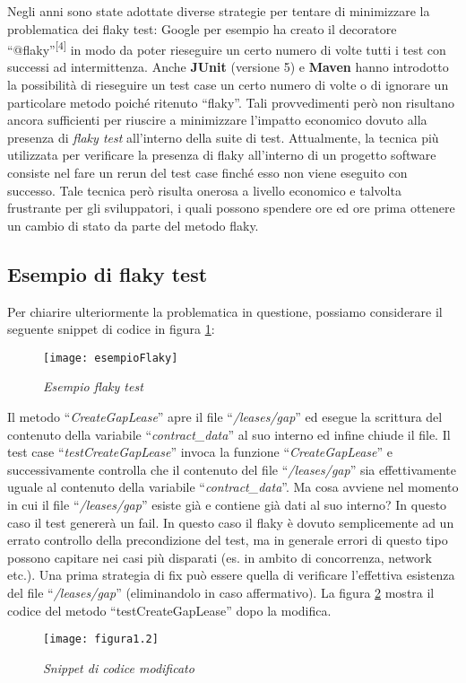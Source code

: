 Negli anni sono state adottate diverse strategie per tentare di minimizzare la problematica dei flaky test: Google per esempio ha creato il decoratore “@flaky”\textsuperscript{[4]}
in modo da poter rieseguire un certo numero di volte tutti i test con successi ad intermittenza. Anche \textbf{JUnit} (versione 5) e \textbf{Maven} hanno introdotto la possibilità di rieseguire un test case un certo numero di volte\cite{petersen2015guidelines}\cite{luo2014empirical} o di ignorare un particolare
metodo poiché ritenuto “flaky”. Tali provvedimenti però non risultano ancora sufficienti per riuscire a minimizzare l’impatto economico dovuto alla presenza di \emph{flaky test} all’interno della suite di test. Attualmente, la tecnica più utilizzata per verificare la presenza di flaky all’interno di un progetto software consiste nel fare un rerun del test case finché esso non viene eseguito con successo. Tale tecnica però
risulta onerosa a livello economico e talvolta frustrante per gli sviluppatori, i quali possono spendere ore ed ore prima ottenere un cambio di stato da parte del metodo flaky.
\subsection{Esempio di flaky test}

Per chiarire ulteriormente la problematica in questione, possiamo considerare il seguente snippet di codice in figura \ref{fig:fig1.1}:
\begin{figure}[h]
	\centering
	\texttt{[image: esempioFlaky]}
	\caption{\emph{Esempio flaky test}}
	\label{fig:fig1.1}
\end{figure}

Il metodo “\emph{CreateGapLease}” apre il file “\emph{/leases/gap}” ed esegue la scrittura del contenuto della variabile “\emph{contract\_data}” al suo interno ed infine chiude il file.
Il test case “\emph{testCreateGapLease}” invoca la funzione “\emph{CreateGapLease}” e successivamente controlla che il contenuto del file “\emph{/leases/gap}” sia effettivamente
uguale al contenuto della variabile “\emph{contract\_data}”.
Ma cosa avviene nel momento in cui il file “\emph{/leases/gap}” esiste già e contiene già dati al suo interno? In questo caso il test genererà un fail. In questo caso il flaky
è dovuto semplicemente ad un errato controllo della precondizione del test, ma in generale errori di questo tipo possono capitare nei casi più disparati (es. in ambito di concorrenza, network etc.).
Una prima strategia di fix può essere quella di verificare l’effettiva esistenza del file “\emph{/leases/gap}” (eliminandolo in caso affermativo).
La figura \ref{fig:fig1.2} mostra il codice del metodo “testCreateGapLease” dopo la modifica.
\begin{figure}[h]
	\centering
	\texttt{[image: figura1.2]}
	\caption{\emph{Snippet di codice modificato}}
	\label{fig:fig1.2}
\end{figure}

